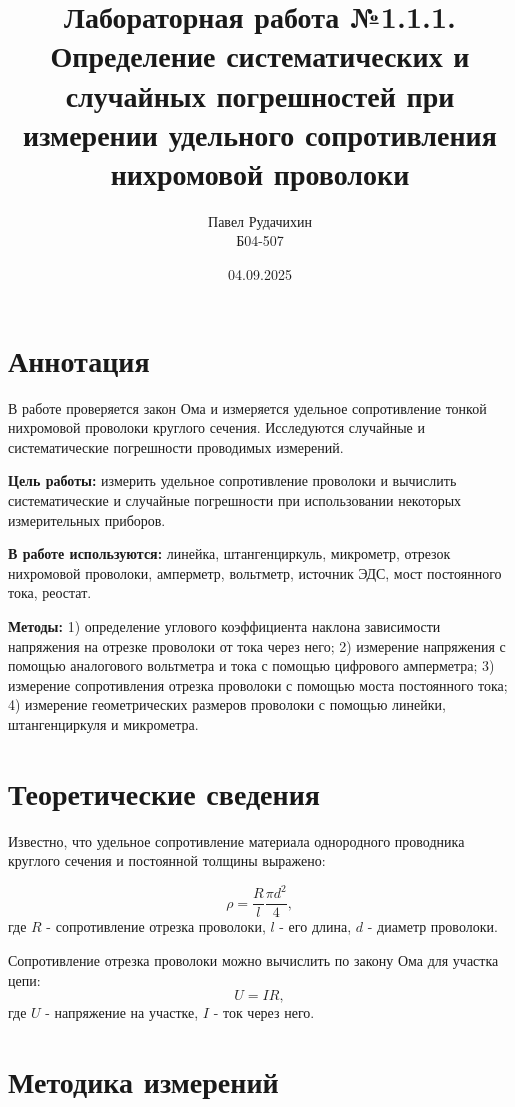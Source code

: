 \documentclass{report}
\title{Лабораторная работа №1.1.1. \\ Определение систематических и случайных погрешностей при измерении удельного сопротивления нихромовой проволоки}
\author{Павел Рудачихин \\ Б04-507}
\date{04.09.2025}
\begin{document}
	\maketitle{}
	\section* {Аннотация} 
	
	В работе проверяется закон Ома и измеряется удельное сопротивление тонкой нихромовой проволоки круглого сечения. Исследуются случайные и систематические погрешности проводимых измерений.
	
	\textbf{Цель работы:} измерить удельное сопротивление проволоки и вычислить систематические и случайные погрешности при использовании некоторых измерительных приборов.

	\textbf{В работе используются:} линейка, штангенциркуль, микрометр, отрезок нихромовой проволоки, амперметр, вольтметр, источник ЭДС, мост постоянного тока, реостат.
	
	\textbf{Методы:} 1) определение  углового  коэффициента  наклона  зависимости 
	напряжения на отрезке проволоки от тока через него; 2) измерение напряжения с помощью аналогового вольтметра и тока с помощью цифрового амперметра; 3) измерение сопротивления отрезка проволоки с помощью моста постоянного тока; 4) измерение геометрических размеров проволоки с помощью линейки, штангенциркуля и микрометра. 
	
		
	\section* {Теоретические сведения}
	
	Известно, что удельное сопротивление материала однородного проводника круглого сечения и постоянной толщины выражено:
	
	\begin{equation} 
		\rho = \frac{R}{l}\frac{\pi d^{2}}{4},
	\end{equation}
	где $R$ - сопротивление отрезка проволоки, $l$ - его длина, $d$ - диаметр проволоки.
	
	Сопротивление отрезка проволоки можно вычислить по закону Ома для участка цепи:
	\begin{equation}
		U = IR,
	\end{equation}
	где $U$ - напряжение на участке, $I$ - ток через него.
	
	\section*{Методика измерений}
	
\end{document}
